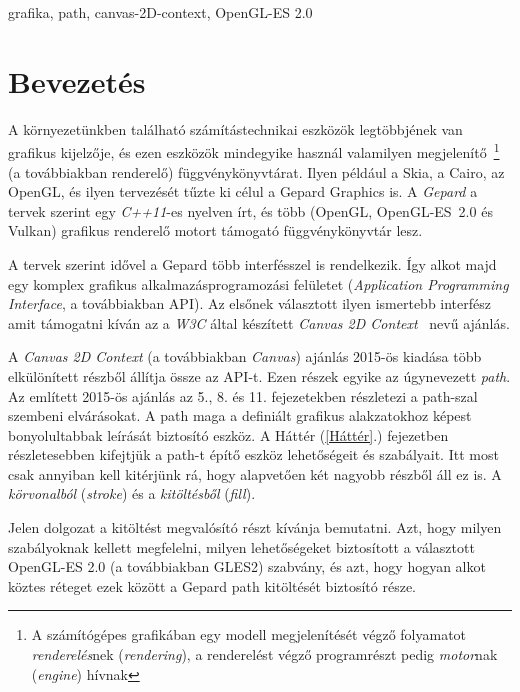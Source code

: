 \documentclass[12pt]{report}
\theoremstyle{definition}
\newcommand{\inenglish}[1]{\textsl{#1}}
\newcommand{\inenglishfn}[1]{\footnotesize{\inenglish{#1}}}
\begin{document}
grafika, path, canvas-2D-context, OpenGL-ES 2.0



    \chapter*{Bevezetés}
    \label{Bevezetés}

  A környezetünkben található számítástechnikai eszközök
legtöbbjének van grafikus kijelzője, és ezen eszközök mindegyike
használ valamilyen megjelenítő~\footnote{A számítógépes grafikában egy
modell megjelenítését végző folyamatot \emph{renderelés}nek
(\inenglishfn{rendering}), a renderelést végző programrészt pedig
\emph{motor}nak (\inenglishfn{engine}) hívnak} (a továbbiakban
renderelő) függvénykönyvtárat. Ilyen például a Skia, a Cairo, az
OpenGL, és ilyen tervezését tűzte ki célul a Gepard Graphics is. A
\emph{Gepard} a tervek szerint egy \emph{C++11}-es nyelven írt, és több
(OpenGL, \mbox{OpenGL-ES 2.0\cite{Munshi:2008:OEP:1481069}} és Vulkan)
grafikus renderelő motort támogató függvénykönyvtár lesz.

  A tervek szerint idővel a Gepard több interfésszel is rendelkezik.
Így alkot majd egy komplex grafikus alkalmazásprogramozási felületet
(\inenglish{Application Programming Interface}, a továbbiakban API). Az
elsőnek választott ilyen ismertebb interfész amit támogatni kíván az a
\emph{W3C} által készített \emph{Canvas 2D
Context}~\cite{Cabanier:14:HCC} nevű ajánlás.

  A \emph{Canvas 2D Context} (a továbbiakban \emph{Canvas}) ajánlás
2015-ös kiadása több elkülönített részből állítja össze az API-t. Ezen
részek egyike az úgynevezett \emph{path}. Az említett 2015-ös ajánlás
az 5., 8. és 11. fejezetekben részletezi a path-szal szembeni
elvárásokat. A path maga a definiált grafikus alakzatokhoz képest
bonyolultabbak leírását biztosító eszköz. A Háttér (\ref{Háttér}.)
fejezetben részletesebben kifejtjük a path-t építő eszköz lehetőségeit
és szabályait. Itt most csak annyiban kell kitérjünk rá, hogy
alapvetően két nagyobb részből áll ez is. A \emph{körvonalból}
(\inenglish{stroke}) és a \emph{kitöltésből} (\inenglish{fill}).

  Jelen dolgozat a kitöltést megvalósító részt kívánja bemutatni.
Azt, hogy milyen szabályoknak kellett megfelelni, milyen lehetőségeket
biztosított a választott OpenGL-ES 2.0 (a továbbiakban GLES2) szabvány,
és azt, hogy hogyan alkot köztes réteget ezek között a Gepard path
kitöltését biztosító része.
\end{document}
